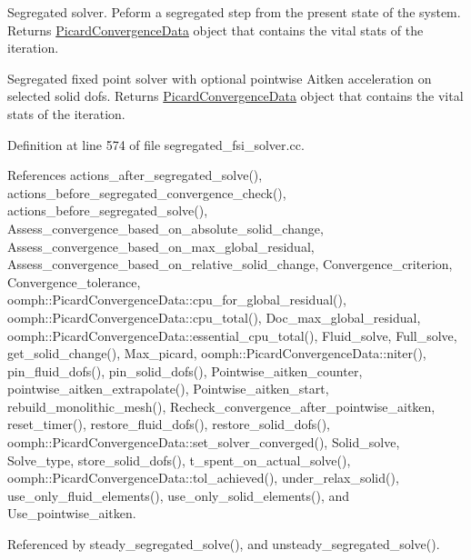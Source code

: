 Segregated solver. Peform a segregated step from the present state of the system. Returns \hyperlink{classoomph_1_1PicardConvergenceData}{Picard\+Convergence\+Data} object that contains the vital stats of the iteration. 

Segregated fixed point solver with optional pointwise Aitken acceleration on selected solid dofs. Returns \hyperlink{classoomph_1_1PicardConvergenceData}{Picard\+Convergence\+Data} object that contains the vital stats of the iteration. 

Definition at line 574 of file segregated\+\_\+fsi\+\_\+solver.\+cc.



References actions\+\_\+after\+\_\+segregated\+\_\+solve(), actions\+\_\+before\+\_\+segregated\+\_\+convergence\+\_\+check(), actions\+\_\+before\+\_\+segregated\+\_\+solve(), Assess\+\_\+convergence\+\_\+based\+\_\+on\+\_\+absolute\+\_\+solid\+\_\+change, Assess\+\_\+convergence\+\_\+based\+\_\+on\+\_\+max\+\_\+global\+\_\+residual, Assess\+\_\+convergence\+\_\+based\+\_\+on\+\_\+relative\+\_\+solid\+\_\+change, Convergence\+\_\+criterion, Convergence\+\_\+tolerance, oomph\+::\+Picard\+Convergence\+Data\+::cpu\+\_\+for\+\_\+global\+\_\+residual(), oomph\+::\+Picard\+Convergence\+Data\+::cpu\+\_\+total(), Doc\+\_\+max\+\_\+global\+\_\+residual, oomph\+::\+Picard\+Convergence\+Data\+::essential\+\_\+cpu\+\_\+total(), Fluid\+\_\+solve, Full\+\_\+solve, get\+\_\+solid\+\_\+change(), Max\+\_\+picard, oomph\+::\+Picard\+Convergence\+Data\+::niter(), pin\+\_\+fluid\+\_\+dofs(), pin\+\_\+solid\+\_\+dofs(), Pointwise\+\_\+aitken\+\_\+counter, pointwise\+\_\+aitken\+\_\+extrapolate(), Pointwise\+\_\+aitken\+\_\+start, rebuild\+\_\+monolithic\+\_\+mesh(), Recheck\+\_\+convergence\+\_\+after\+\_\+pointwise\+\_\+aitken, reset\+\_\+timer(), restore\+\_\+fluid\+\_\+dofs(), restore\+\_\+solid\+\_\+dofs(), oomph\+::\+Picard\+Convergence\+Data\+::set\+\_\+solver\+\_\+converged(), Solid\+\_\+solve, Solve\+\_\+type, store\+\_\+solid\+\_\+dofs(), t\+\_\+spent\+\_\+on\+\_\+actual\+\_\+solve(), oomph\+::\+Picard\+Convergence\+Data\+::tol\+\_\+achieved(), under\+\_\+relax\+\_\+solid(), use\+\_\+only\+\_\+fluid\+\_\+elements(), use\+\_\+only\+\_\+solid\+\_\+elements(), and Use\+\_\+pointwise\+\_\+aitken.



Referenced by steady\+\_\+segregated\+\_\+solve(), and unsteady\+\_\+segregated\+\_\+solve().

\mbox{\label{classoomph_1_1SegregatableFSIProblem_a12e662227e5daf656244a531f40022f9}} 
